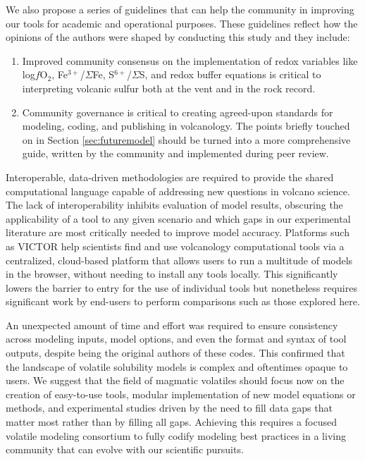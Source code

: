 \documentclass[draft, english]{volcanica-template}
\begin{document}
We also propose a series of guidelines that can help the community in improving our tools for academic and operational purposes. These guidelines reflect how the opinions of the authors were shaped by conducting this study and they include:
\begin{enumerate}
    \item Improved community consensus on the implementation of redox variables like log$f$O$_2$, Fe$^{3+}$/$\Sigma$Fe, S$^{6+}$/$\Sigma$S, and redox buffer equations is critical to interpreting volcanic sulfur both at the vent and in the rock record.
    \item Community governance is critical to creating agreed-upon standards for modeling, coding, and publishing in volcanology. The points briefly touched on in Section \ref{sec:futuremodel} should be turned into a more comprehensive guide, written by the community and implemented during peer review. 
\end{enumerate}

Interoperable, data-driven methodologies are required to provide the shared computational language capable of addressing new questions in volcano science. The lack of interoperability inhibits evaluation of model results, obscuring the applicability of a tool to any given scenario and which gaps in our experimental literature are most critically needed to improve model accuracy. Platforms such as VICTOR \parencite{lev2025victor} help scientists find and use volcanology computational tools via a centralized, cloud-based platform that allows users to run a multitude of models in the browser, without needing to install any tools locally. This significantly lowers the barrier to entry for the use of individual tools but nonetheless requires significant work by end-users to perform comparisons such as those explored here. 

An unexpected amount of time and effort was required to ensure consistency across modeling inputs, model options, and even the format and syntax of tool outputs, despite being the original authors of these codes. This confirmed that the landscape of volatile solubility models is complex and oftentimes opaque to users. We suggest that the field of magmatic volatiles should focus now on the creation of easy-to-use tools, modular implementation of new model equations or methods, and experimental studies driven by the need to fill data gaps that matter most rather than by filling all gaps. Achieving this requires a focused volatile modeling consortium to fully codify modeling best practices in a living community that can evolve with our scientific pursuits. 
\end{document}
